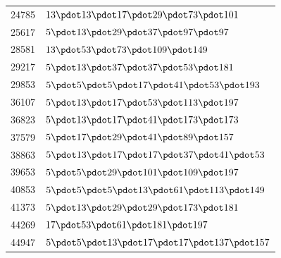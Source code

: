\begin{longtable}{@{}r|l@{}}
24785 & $13\pdot 13\pdot 17\pdot 29\pdot 73\pdot 101$\\
25617 & $5\pdot 13\pdot 29\pdot 37\pdot 97\pdot 97$\\
28581 & $13\pdot 53\pdot 73\pdot 109\pdot 149$\\
29217 & $5\pdot 13\pdot 37\pdot 37\pdot 53\pdot 181$\\
29853 & $5\pdot 5\pdot 5\pdot 17\pdot 41\pdot 53\pdot 193$\\
36107 & $5\pdot 13\pdot 17\pdot 53\pdot 113\pdot 197$\\
36823 & $5\pdot 13\pdot 17\pdot 41\pdot 173\pdot 173$\\
37579 & $5\pdot 17\pdot 29\pdot 41\pdot 89\pdot 157$\\
38863 & $5\pdot 13\pdot 17\pdot 17\pdot 37\pdot 41\pdot 53$\\
39653 & $5\pdot 5\pdot 29\pdot 101\pdot 109\pdot 197$\\
40853 & $5\pdot 5\pdot 5\pdot 13\pdot 61\pdot 113\pdot 149$\\
41373 & $5\pdot 13\pdot 29\pdot 29\pdot 173\pdot 181$\\
44269 & $17\pdot 53\pdot 61\pdot 181\pdot 197$\\
44947 & $5\pdot 5\pdot 13\pdot 17\pdot 17\pdot 137\pdot 157$\\
\end{longtable}\endgroup
